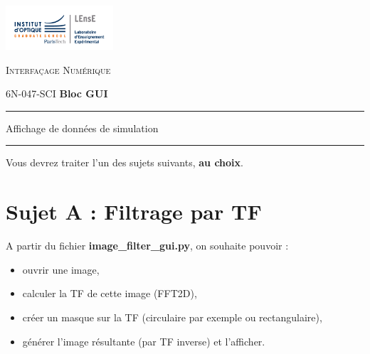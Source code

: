 \documentclass[a4paper,11pt,titlepage]{article} %
\begin{document}
\newpage
\strut %

\begin{minipage}[c]{.25\linewidth}
	\includegraphics[width=4cm]{images/Logo-LEnsE.png}
\end{minipage} \hfill
\begin{minipage}[c]{.4\linewidth}

\begin{center}
\vspace{0.3cm}
{\Large \textsc{Interfaçage Numérique}}

\medskip

6N-047-SCI \qquad \textbf{\Large Bloc GUI}

\end{center}
\end{minipage}\hfill

\vspace{0.5cm}

\noindent \rule{\linewidth}{1pt}

{\noindent\Large \rule[-7pt]{0pt}{30pt} Affichage de données de simulation} 

\noindent \rule{\linewidth}{1pt}


Vous devrez traiter l'un des sujets suivants, \textbf{au choix}.


\section{Sujet A : Filtrage par TF}

A partir du fichier \textbf{image\_filter\_gui.py}, on souhaite pouvoir :

\begin{itemize}
	\item ouvrir une image,
	\item calculer la TF de cette image (FFT2D),
	\item créer un masque sur la TF (circulaire par exemple ou rectangulaire),
	\item générer l'image résultante (par TF inverse) et l'afficher.
\end{itemize}
\end{document}
